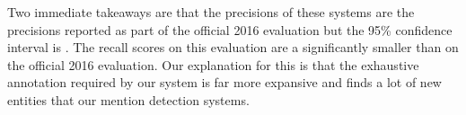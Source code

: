 Two immediate takeaways are that the precisions of these systems are  the precisions reported as part of the official 2016 evaluation but the 95\% confidence interval is .
The recall scores on this evaluation are a significantly smaller than on the official 2016 evaluation.
Our explanation for this is that the exhaustive annotation required by our system is far more expansive and finds a lot of new entities that our mention detection systems. 
